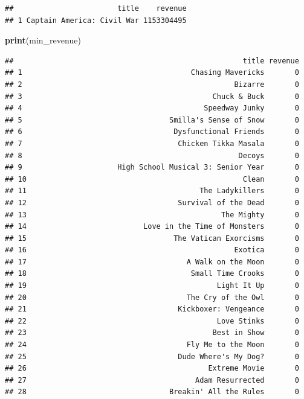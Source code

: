 \documentclass[
]{article}
\newenvironment{Shaded}{\begin{snugshade}}{\end{snugshade}}
\newcommand{\FunctionTok}[1]{\textcolor[rgb]{0.13,0.29,0.53}{\textbf{#1}}}
\newcommand{\NormalTok}[1]{#1}
\begin{document}
\begin{verbatim}
##                        title    revenue
## 1 Captain America: Civil War 1153304495
\end{verbatim}

\begin{Shaded}
\begin{Highlighting}[]
\FunctionTok{print}\NormalTok{(min\_revenue)}
\end{Highlighting}
\end{Shaded}

\begin{verbatim}
##                                                     title revenue
## 1                                       Chasing Mavericks       0
## 2                                                 Bizarre       0
## 3                                            Chuck & Buck       0
## 4                                          Speedway Junky       0
## 5                                  Smilla's Sense of Snow       0
## 6                                   Dysfunctional Friends       0
## 7                                    Chicken Tikka Masala       0
## 8                                                  Decoys       0
## 9                      High School Musical 3: Senior Year       0
## 10                                                  Clean       0
## 11                                        The Ladykillers       0
## 12                                   Survival of the Dead       0
## 13                                             The Mighty       0
## 14                           Love in the Time of Monsters       0
## 15                                  The Vatican Exorcisms       0
## 16                                                Exotica       0
## 17                                     A Walk on the Moon       0
## 18                                      Small Time Crooks       0
## 19                                            Light It Up       0
## 20                                     The Cry of the Owl       0
## 21                                   Kickboxer: Vengeance       0
## 22                                            Love Stinks       0
## 23                                           Best in Show       0
## 24                                     Fly Me to the Moon       0
## 25                                   Dude Where's My Dog?       0
## 26                                          Extreme Movie       0
## 27                                       Adam Resurrected       0
## 28                                 Breakin' All the Rules       0

\end{verbatim}
\end{document}
